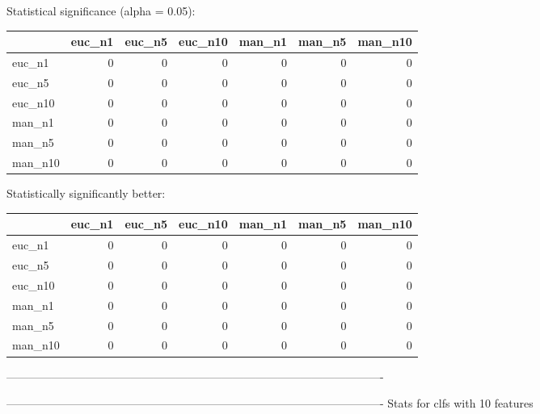 Statistical significance (alpha = 0.05):
 \begin{tabular}{lrrrrrr}
\hline
         &   euc\_n1 &   euc\_n5 &   euc\_n10 &   man\_n1 &   man\_n5 &   man\_n10 \\
\hline
 euc\_n1  &        0 &        0 &         0 &        0 &        0 &         0 \\
 euc\_n5  &        0 &        0 &         0 &        0 &        0 &         0 \\
 euc\_n10 &        0 &        0 &         0 &        0 &        0 &         0 \\
 man\_n1  &        0 &        0 &         0 &        0 &        0 &         0 \\
 man\_n5  &        0 &        0 &         0 &        0 &        0 &         0 \\
 man\_n10 &        0 &        0 &         0 &        0 &        0 &         0 \\
\hline
\end{tabular} 

Statistically significantly better:
 \begin{tabular}{lrrrrrr}
\hline
         &   euc\_n1 &   euc\_n5 &   euc\_n10 &   man\_n1 &   man\_n5 &   man\_n10 \\
\hline
 euc\_n1  &        0 &        0 &         0 &        0 &        0 &         0 \\
 euc\_n5  &        0 &        0 &         0 &        0 &        0 &         0 \\
 euc\_n10 &        0 &        0 &         0 &        0 &        0 &         0 \\
 man\_n1  &        0 &        0 &         0 &        0 &        0 &         0 \\
 man\_n5  &        0 &        0 &         0 &        0 &        0 &         0 \\
 man\_n10 &        0 &        0 &         0 &        0 &        0 &         0 \\
\hline
\end{tabular} 

----------------------------------------------------------------------------------------------------



----------------------------------------------------------------------------------------------------
Stats for clfs with 10 features


